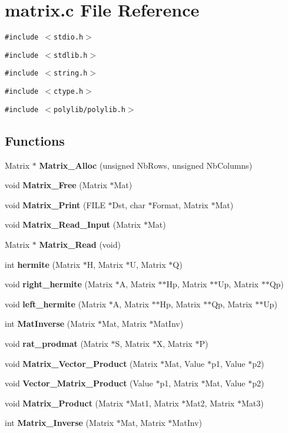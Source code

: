 \section{matrix.c File Reference}
\label{matrix_8c}
{\tt \#include $<$stdio.h$>$}\par
{\tt \#include $<$stdlib.h$>$}\par
{\tt \#include $<$string.h$>$}\par
{\tt \#include $<$ctype.h$>$}\par
{\tt \#include $<$polylib/polylib.h$>$}\par
\subsection*{Functions}
\begin{CompactItemize}
\item 
Matrix $\ast$ {\bf Matrix\_\-Alloc} (unsigned Nb\-Rows, unsigned Nb\-Columns)
\item 
void {\bf Matrix\_\-Free} (Matrix $\ast$Mat)
\item 
void {\bf Matrix\_\-Print} (FILE $\ast$Dst, char $\ast$Format, Matrix $\ast$Mat)
\item 
void {\bf Matrix\_\-Read\_\-Input} (Matrix $\ast$Mat)
\item 
Matrix $\ast$ {\bf Matrix\_\-Read} (void)
\item 
int {\bf hermite} (Matrix $\ast$H, Matrix $\ast$U, Matrix $\ast$Q)
\item 
void {\bf right\_\-hermite} (Matrix $\ast$A, Matrix $\ast$$\ast$Hp, Matrix $\ast$$\ast$Up, Matrix $\ast$$\ast$Qp)
\item 
void {\bf left\_\-hermite} (Matrix $\ast$A, Matrix $\ast$$\ast$Hp, Matrix $\ast$$\ast$Qp, Matrix $\ast$$\ast$Up)
\item 
int {\bf Mat\-Inverse} (Matrix $\ast$Mat, Matrix $\ast$Mat\-Inv)
\item 
void {\bf rat\_\-prodmat} (Matrix $\ast$S, Matrix $\ast$X, Matrix $\ast$P)
\item 
void {\bf Matrix\_\-Vector\_\-Product} (Matrix $\ast$Mat, Value $\ast$p1, Value $\ast$p2)
\item 
void {\bf Vector\_\-Matrix\_\-Product} (Value $\ast$p1, Matrix $\ast$Mat, Value $\ast$p2)
\item 
void {\bf Matrix\_\-Product} (Matrix $\ast$Mat1, Matrix $\ast$Mat2, Matrix $\ast$Mat3)
\item 
int {\bf Matrix\_\-Inverse} (Matrix $\ast$Mat, Matrix $\ast$Mat\-Inv)
\end{CompactItemize}



